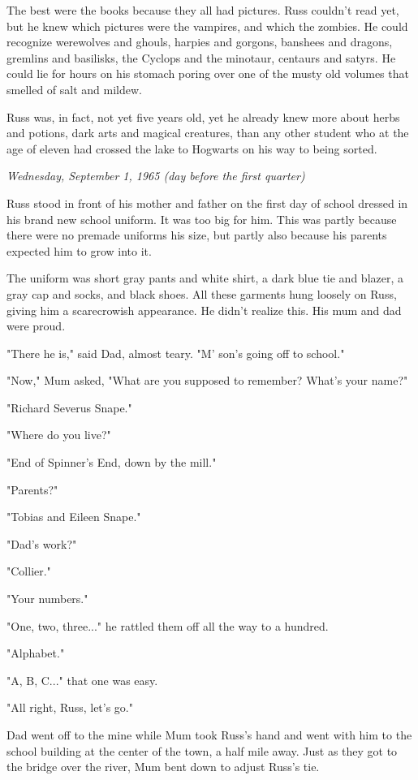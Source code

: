 \documentclass[a4paper,11pt]{article}
\begin{document}
The best were the books because they all had pictures. Russ couldn't read yet, but he knew which pictures were the vampires, and which the zombies. He could recognize werewolves and ghouls, harpies and gorgons, banshees and dragons, gremlins and basilisks, the Cyclops and the minotaur, centaurs and satyrs. He could lie for hours on his stomach poring over one of the musty old volumes that smelled of salt and mildew.

Russ was, in fact, not yet five years old, yet he already knew more about herbs and potions, dark arts and magical creatures, than any other student who at the age of eleven had crossed the lake to Hogwarts on his way to being sorted.

\emph{Wednesday, September 1, 1965 (day before the first quarter)}

Russ stood in front of his mother and father on the first day of school dressed in his brand new school uniform. It was too big for him. This was partly because there were no premade uniforms his size, but partly also because his parents expected him to grow into it.

The uniform was short gray pants and white shirt, a dark blue tie and blazer, a gray cap and socks, and black shoes. All these garments hung loosely on Russ, giving him a scarecrowish appearance. He didn't realize this. His mum and dad were proud.

"There he is," said Dad, almost teary. "M' son's going off to school."

"Now," Mum asked, "What are you supposed to remember? What's your name?"

"Richard Severus Snape."

"Where do you live?"

"End of Spinner's End, down by the mill."

"Parents?"

"Tobias and Eileen Snape."

"Dad's work?"

"Collier."

"Your numbers."

"One, two, three..." he rattled them off all the way to a hundred.

"Alphabet."

"A, B, C..." that one was easy.

"All right, Russ, let's go."

Dad went off to the mine while Mum took Russ's hand and went with him to the school building at the center of the town, a half mile away. Just as they got to the bridge over the river, Mum bent down to adjust Russ's tie.
\end{document}
